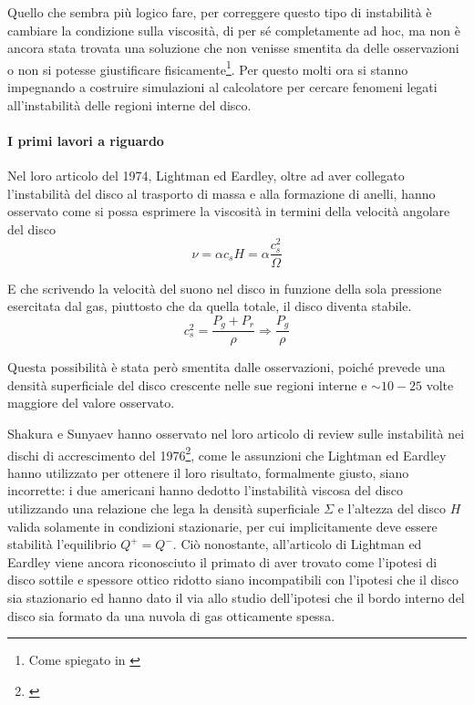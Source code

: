 \documentclass[a4paperbi]{article}
\begin{document}
	Quello che sembra più logico fare, per correggere questo tipo di instabilità è cambiare la condizione sulla viscosità, di per sé completamente ad hoc, ma non è ancora stata trovata una soluzione che non venisse smentita da delle osservazioni o non si potesse giustificare fisicamente\footnote{Come spiegato in \cite{Pringle1981}}. Per questo molti ora si stanno impegnando a costruire simulazioni al calcolatore per cercare fenomeni legati all'instabilità delle regioni interne del disco.

	\paragraph{I primi lavori a riguardo}		
	Nel loro articolo del 1974, Lightman ed Eardley, oltre ad aver collegato l'instabilità del disco al trasporto di massa e alla formazione di anelli, hanno osservato come si possa esprimere la viscosità in termini della velocità angolare del disco
	\begin{equation}
		\nu=\alpha c_sH=\alpha\frac{c_s^2}{\Omega}
	\end{equation}
	
	E che scrivendo la velocità del suono nel disco in funzione della sola pressione esercitata dal gas, piuttosto che da quella totale, il disco diventa stabile.
	\begin{equation}
		c_s^2=\frac{P_g+P_r}{\rho}\Longrightarrow\frac{P_g}{\rho}
	\end{equation}
	
	Questa possibilità è stata però smentita dalle osservazioni, poiché prevede una densità superficiale del disco crescente nelle sue regioni interne e $\sim10-25$ volte maggiore del valore osservato.
	
	Shakura e Sunyaev hanno osservato nel loro articolo di review sulle instabilità nei dischi di accrescimento del 1976\footnote{\cite{ShakuraSunyaev1976}}, come le assunzioni che Lightman ed Eardley hanno utilizzato per ottenere il loro risultato, formalmente giusto, siano incorrette: i due americani hanno dedotto l'instabilità viscosa del disco utilizzando una relazione che lega la densità superficiale $\Sigma$ e l'altezza del disco $H$ valida solamente in condizioni stazionarie, per cui implicitamente deve essere stabilità l'equilibrio $Q^+=Q^-$. Ciò nonostante, all'articolo di Lightman ed Eardley viene ancora riconosciuto il primato di aver trovato  come l'ipotesi di disco sottile e spessore ottico ridotto siano incompatibili con l'ipotesi che il disco sia stazionario ed hanno dato il via allo studio dell'ipotesi che il bordo interno del disco sia formato da una nuvola di gas otticamente spessa.
	
\end{document}
